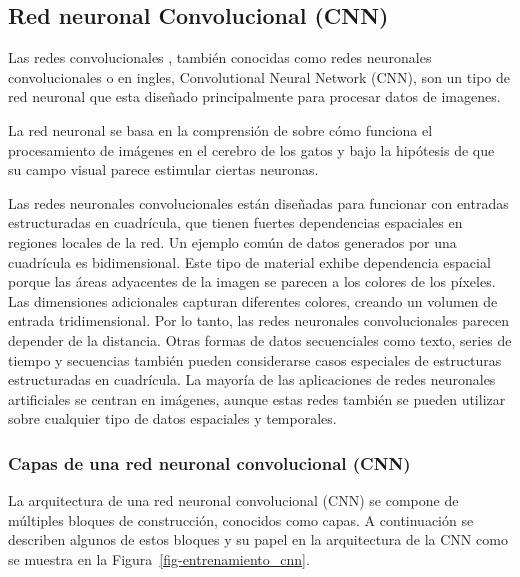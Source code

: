 \documentclass[
  us-letterpaper,
]{scrreprt}
\theoremstyle{plain}
\theoremstyle{definition}
\theoremstyle{definition}
\theoremstyle{remark}
\begin{document}
\subsection{Red neuronal Convolucional
(CNN)}\label{red-neuronal-convolucional-cnn}

Las redes convolucionales \autocite{lecun1989generalization}, también
conocidas como redes neuronales convolucionales o en ingles,
Convolutional Neural Network (CNN), son un tipo de red neuronal que esta
diseñado principalmente para procesar datos de imagenes.

La red neuronal se basa en la comprensión de
\textcite{hubel1959receptive} sobre cómo funciona el procesamiento de
imágenes en el cerebro de los gatos y bajo la hipótesis de que su campo
visual parece estimular ciertas neuronas.

Las redes neuronales convolucionales están diseñadas para funcionar con
entradas estructuradas en cuadrícula, que tienen fuertes dependencias
espaciales en regiones locales de la red. Un ejemplo común de datos
generados por una cuadrícula es bidimensional. Este tipo de material
exhibe dependencia espacial porque las áreas adyacentes de la imagen se
parecen a los colores de los píxeles. Las dimensiones adicionales
capturan diferentes colores, creando un volumen de entrada
tridimensional. Por lo tanto, las redes neuronales convolucionales
parecen depender de la distancia. Otras formas de datos secuenciales
como texto, series de tiempo y secuencias también pueden considerarse
casos especiales de estructuras estructuradas en cuadrícula. La mayoría
de las aplicaciones de redes neuronales artificiales se centran en
imágenes, aunque estas redes también se pueden utilizar sobre cualquier
tipo de datos espaciales y temporales.

\subsubsection{Capas de una red neuronal convolucional
(CNN)}\label{capas-de-una-red-neuronal-convolucional-cnn}

La arquitectura de una red neuronal convolucional (CNN) se compone de
múltiples bloques de construcción, conocidos como capas. A continuación
se describen algunos de estos bloques y su papel en la arquitectura de
la CNN como se muestra en la Figura~\ref{fig-entrenamiento_cnn}.
\end{document}
